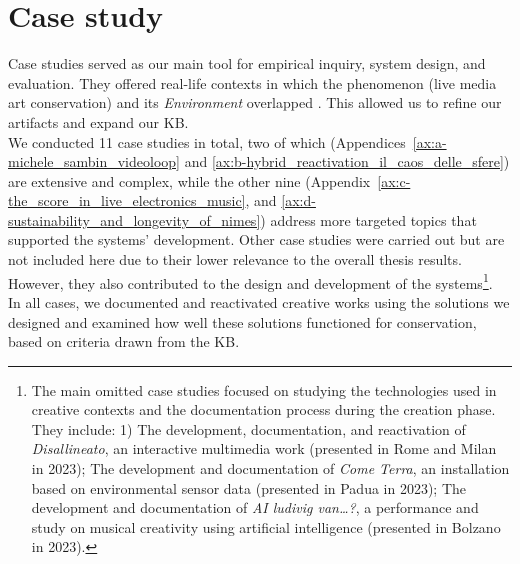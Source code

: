 \section{Case study}
Case studies served as our main tool for empirical inquiry, system design, and evaluation. They offered real-life contexts in which the phenomenon (live media art conservation) and its \textit{Environment} overlapped \cite{yin2009case}. This allowed us to refine our artifacts and expand our KB.\\
We conducted 11 case studies in total, two of which (Appendices~\ref{ax:a-michele_sambin_videoloop} and \ref{ax:b-hybrid_reactivation_il_caos_delle_sfere}) are extensive and complex, while the other nine (Appendix~\ref{ax:c-the_score_in_live_electronics_music}, and \ref{ax:d-sustainability_and_longevity_of_nimes}) address more targeted topics that supported the systems’ development. Other case studies were carried out but are not included here due to their lower relevance to the overall thesis results. However, they also contributed to the design and development of the systems\footnote{The main omitted case studies focused on studying the technologies used in creative contexts and the documentation process during the creation phase. They include: 1) The development, documentation, and reactivation of \textit{Disallineato}, an interactive multimedia work (presented in Rome and Milan in 2023); The development and documentation of \textit{Come Terra}, an installation based on environmental sensor data (presented in Padua in 2023); The development and documentation of \textit{AI ludivig van…?}, a performance and study on musical creativity using artificial intelligence (presented in Bolzano in 2023).}.\\
In all cases, we documented and reactivated creative works using the solutions we designed and examined how well these solutions functioned for conservation, based on criteria drawn from the KB.

